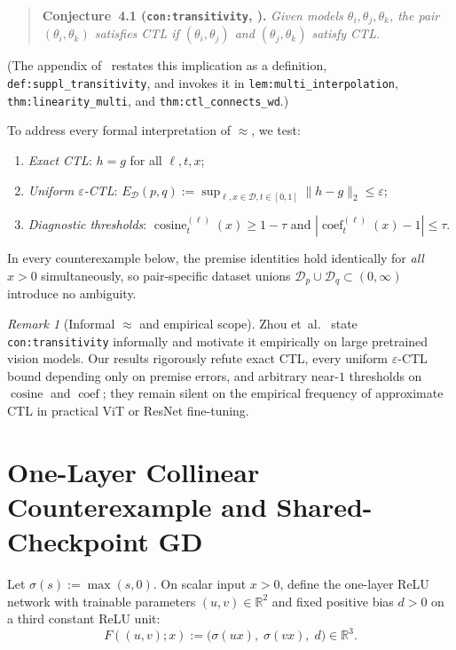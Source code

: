 \documentclass[11pt]{article}
\theoremstyle{plain}
\theoremstyle{definition}
\theoremstyle{remark}
\newtheorem{remark}{Remark}
\DeclareMathOperator{\cosine}{cosine}
\DeclareMathOperator{\coef}{coef}
\begin{document}
\begin{quote}
\textbf{Conjecture~4.1 (\texttt{con:transitivity}, \cite[Section~4.1]{zhou2024ctl}).}
\emph{Given models $\theta_i, \theta_j, \theta_k$, the pair $(\theta_i, \theta_k)$ satisfies CTL if $(\theta_i, \theta_j)$ and $(\theta_j, \theta_k)$ satisfy CTL.}
\end{quote}
(The appendix of~\cite{zhou2024ctl} restates this implication as a definition, \texttt{def:suppl\_\allowbreak transitivity}, and invokes it in \texttt{lem:multi\_\allowbreak interpolation}, \texttt{thm:linearity\_\allowbreak multi}, and \texttt{thm:ctl\_\allowbreak connects\_wd}.)

To address every formal interpretation of $\approx$, we test:
\begin{enumerate}[label=\textup{(\roman*)},nosep]
\item \emph{Exact CTL}: $h = g$ for all $\ell, t, x$;
\item \emph{Uniform $\varepsilon$-CTL}: $E_{\mathcal{D}}(p, q) := \sup_{\ell, x \in \mathcal{D}, t \in [0,1]} \|h - g\|_2 \le \varepsilon$;
\item \emph{Diagnostic thresholds}: $\cosine_t^{(\ell)}(x) \ge 1 - \tau$ and $|\coef_t^{(\ell)}(x) - 1| \le \tau$.
\end{enumerate}
In every counterexample below, the premise identities hold identically for \emph{all} $x > 0$ simultaneously, so pair-specific dataset unions $\mathcal{D}_p \cup \mathcal{D}_q \subset (0, \infty)$ introduce no ambiguity.

\begin{remark}[Informal $\approx$ and empirical scope]
Zhou et~al.~\cite{zhou2024ctl} state \texttt{con:transitivity} informally and motivate it empirically on large pretrained vision models. Our results rigorously refute exact CTL, every uniform $\varepsilon$-CTL bound depending only on premise errors, and arbitrary near-$1$ thresholds on $\cosine$ and $\coef$; they remain silent on the empirical frequency of approximate CTL in practical ViT or ResNet fine-tuning.
\end{remark}

\section{One-Layer Collinear Counterexample and Shared-Checkpoint GD}

Let $\sigma(s) := \max(s, 0)$. On scalar input $x > 0$, define the one-layer ReLU network with trainable parameters $(u, v) \in \mathbb{R}^2$ and fixed positive bias $d > 0$ on a third constant ReLU unit:
\[
F((u, v); x) := \bigl(\sigma(ux),\; \sigma(vx),\; d\bigr) \in \mathbb{R}^3.
\]
\end{document}

